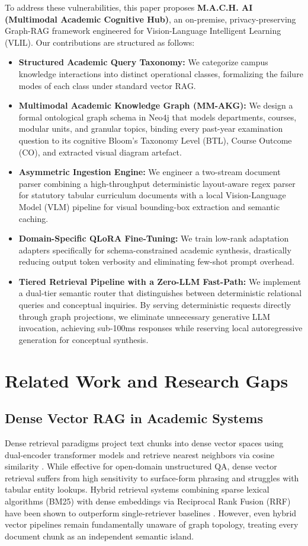 \documentclass[conference]{IEEEtran}
\begin{document}
To address these vulnerabilities, this paper proposes \textbf{M.A.C.H. AI (Multimodal Academic Cognitive Hub)}, an on-premise, privacy-preserving Graph-RAG framework engineered for Vision-Language Intelligent Learning (VLIL). Our contributions are structured as follows:
\begin{itemize}
    \item \textbf{Structured Academic Query Taxonomy:} We categorize campus knowledge interactions into distinct operational classes, formalizing the failure modes of each class under standard vector RAG.
    \item \textbf{Multimodal Academic Knowledge Graph (MM-AKG):} We design a formal ontological graph schema in Neo4j that models departments, courses, modular units, and granular topics, binding every past-year examination question to its cognitive Bloom's Taxonomy Level (BTL), Course Outcome (CO), and extracted visual diagram artefact.
    \item \textbf{Asymmetric Ingestion Engine:} We engineer a two-stream document parser combining a high-throughput deterministic layout-aware regex parser for statutory tabular curriculum documents with a local Vision-Language Model (VLM) pipeline for visual bounding-box extraction and semantic caching.
    \item \textbf{Domain-Specific QLoRA Fine-Tuning:} We train low-rank adaptation adapters specifically for schema-constrained academic synthesis, drastically reducing output token verbosity and eliminating few-shot prompt overhead.
    \item \textbf{Tiered Retrieval Pipeline with a Zero-LLM Fast-Path:} We implement a dual-tier semantic router that distinguishes between deterministic relational queries and conceptual inquiries. By serving deterministic requests directly through graph projections, we eliminate unnecessary generative LLM invocation, achieving sub-100ms responses while reserving local autoregressive generation for conceptual synthesis.
\end{itemize}

\section{Related Work and Research Gaps}

\subsection{Dense Vector RAG in Academic Systems}
Dense retrieval paradigms project text chunks into dense vector spaces using dual-encoder transformer models and retrieve nearest neighbors via cosine similarity \cite{lewis2020rag, izacard2021leveraging}. While effective for open-domain unstructured QA, dense vector retrieval suffers from high sensitivity to surface-form phrasing and struggles with tabular entity lookups. Hybrid retrieval systems combining sparse lexical algorithms (BM25) with dense embeddings via Reciprocal Rank Fusion (RRF) have been shown to outperform single-retriever baselines \cite{cormack2009reciprocal}. However, even hybrid vector pipelines remain fundamentally unaware of graph topology, treating every document chunk as an independent semantic island.
\end{document}
